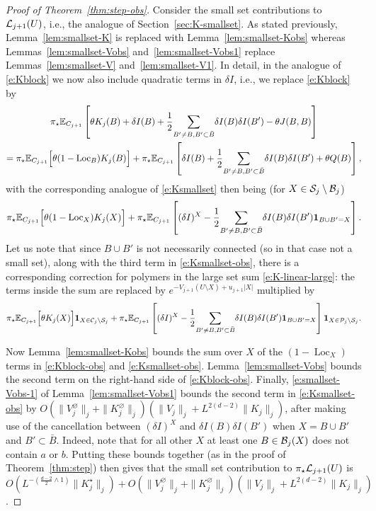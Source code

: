 \documentclass[11pt]{amsart}
\numberwithin{equation}{section}
\numberwithin{theorem}{section}
\newcommand{\1}{{\bf 1}}
\newcommand{\obs}{\star}
\newcommand{\Vbulk}{V^\varnothing}
\newcommand{\Kbulk}{K^\varnothing}
\newcommand{\Kobs}{K^\obs}
\newcommand{\dplus}{(\frac{d-2}{2} \wedge 1)}
\newcommand{\Loc}{\operatorname{Loc}}
\begin{document}
\begin{proof}[Proof of Theorem~\ref{thm:step-obs}]
  Consider the small set contributions to   $\mathcal L_{j+1}(U)$,
  i.e., the analogue of Section~\ref{sec:K-smallset}.
  As stated
  previously, Lemma~\ref{lem:smallset-K} is replaced with
  Lemma~\ref{lem:smallset-Kobs} whereas Lemmas~\ref{lem:smallset-Vobs}
  and~\ref{lem:smallset-Vobs1} replace Lemmas~\ref{lem:smallset-V}
  and~\ref{lem:smallset-V1}.
  In detail, in the analogue of \eqref{e:Kblock} we now also include
    quadratic terms in $\delta I$, i.e., we replace \eqref{e:Kblock} by
  \begin{multline} \label{e:Kblock-obs}
    \pi_\obs\E_{C_{j+1}}\qa{\theta K_j(B) 
      + 
      \delta I(B)
      + \frac12   { \sum_{ B' \neq  B, B'\subset \bar{B}}}
      \delta I(B) \delta I(B')
      - 
      \theta J(B,B)}
    \\
    =\pi_\obs\E_{C_{j+1}}\qB{\theta (1-\Loc_B)K_j(B)}
    + \pi_\obs\E_{C_{j+1}}\qa{\delta I(B) + \frac12  {\sum_{ B' \neq  B, B'\subset \bar{B}}}     \delta I(B) \delta I(B')
    + \theta Q(B)},
  \end{multline}
  with the corresponding analogue of \eqref{e:Ksmallset} then being
  (for $X\in \mathcal S_{j}\setminus \mathcal B_{j}$)
  \begin{equation}
    \label{e:Ksmallset-obs}
    \pi_\obs \E_{C_{j+1}}\qB{\theta (1-\Loc_X)  K_j(X)}
    + \pi_\obs \E_{C_{j+1}} \qa{(\delta I)^X- \frac 12 { \sum_{ B' \neq  B, B'\subset \bar{B}}} \delta I(B) \delta I(B')\1_{B\cup B'=X}}. 
\end{equation}
Let us note that since $B \cup B'$ is not necessarily connected (so in that case not a small set),
along with the third term  in \eqref{e:Ksmallset-obs}, there is a corresponding correction for polymers in the large set sum
\eqref{e:K-linear-large}: the terms inside the sum are replaced by
$e^{-V_{j+1}(U \setminus X)+u_{j+1}|X|}$ multiplied by
\begin{equation}
    \label{e:Kquad-obs}
    \pi_\obs \E_{C_{j+1}}\qB{\theta K_j(X)}\1_{X\in \mathcal C_j\backslash \mathcal S_j}
    + \pi_\obs \E_{C_{j+1}} \qa{(\delta I)^X-\frac 12 {\sum_{ B' \neq  B, B'\subset \bar{B}}}  \delta I(B) \delta I(B')\1_{B\cup B'=X}}\1_{X\in \mathcal P_j\backslash \mathcal S_j}.
\end{equation}


Now Lemma~\ref{lem:smallset-Kobs} bounds the sum over $X$ of the
$(1-\Loc_X)$ terms in \eqref{e:Kblock-obs} and
\eqref{e:Ksmallset-obs}.  Lemma~\ref{lem:smallset-Vobs} bounds the
second term on the right-hand side of \eqref{e:Kblock-obs}.  Finally,
\eqref{e:smallset-Vobs-1} of Lemma~\ref{lem:smallset-Vobs1} bounds the
second term in \eqref{e:Ksmallset-obs} by
$O(\|\Vbulk_j\|_j+\|\Kbulk_j\|_j)(\|V_j\|_j+L^{2(d-2)}\|K_j\|_j)$,
after making use of the cancellation between $(\delta I)^X$ and
$\delta I(B)\delta I(B')$ when $X = B \cup B'$ and
$B' \subset \bar B$. Indeed, note that
for all other $X$ at least one $B \in \mathcal B_j(X)$ does not contain $a$ or $b$.
%
Putting these bounds together
 (as in the proof of Theorem~\ref{thm:step}) 
then gives that the small set contribution to
  $\pi_{\obs}\cL_{j+1}(U)$ is $O(L^{-\dplus}\|\Kobs_j\|_j) + O(\|\Vbulk_j\|_j+\|\Kbulk_j\|_j)(\|V_j\|_j+L^{2(d-2)}\|K_j\|_j)$. 




\end{proof}
\end{document}
